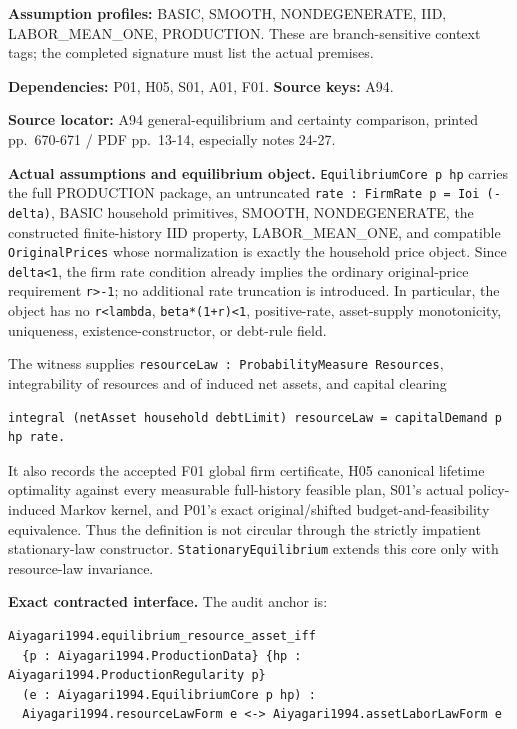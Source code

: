 \documentclass[
  11pt,
]{article}
\let\LedgerOriginalTexttt\texttt
\renewcommand{\texttt}[1]{{\small\LedgerOriginalTexttt{#1}}}
\begin{document}
\textbf{Assumption profiles:} BASIC, SMOOTH, NONDEGENERATE, IID,
LABOR\_MEAN\_ONE, PRODUCTION. These are branch-sensitive context tags;
the completed signature must list the actual premises.

\textbf{Dependencies:} P01, H05, S01, A01, F01. \textbf{Source keys:}
A94.

\textbf{Source locator:} A94 general-equilibrium and certainty
comparison, printed pp.~670-671 / PDF pp.~13-14, especially notes 24-27.

\textbf{Actual assumptions and equilibrium object.}
\texttt{EquilibriumCore\ p\ hp} carries the full PRODUCTION package, an
untruncated \texttt{rate\ :\ FirmRate\ p\ =\ Ioi\ (-delta)}, BASIC
household primitives, SMOOTH, NONDEGENERATE, the constructed
finite-history IID property, LABOR\_MEAN\_ONE, and compatible
\texttt{OriginalPrices} whose normalization is exactly the household
price object. Since \texttt{delta\textless{}1}, the firm rate condition
already implies the ordinary original-price requirement
\texttt{r\textgreater{}-1}; no additional rate truncation is introduced.
In particular, the object has no \texttt{r\textless{}lambda},
\texttt{beta*(1+r)\textless{}1}, positive-rate, asset-supply
monotonicity, uniqueness, existence-constructor, or debt-rule field.

The witness supplies
\texttt{resourceLaw\ :\ ProbabilityMeasure\ Resources}, integrability of
resources and of induced net assets, and capital clearing

\begin{verbatim}
integral (netAsset household debtLimit) resourceLaw = capitalDemand p hp rate.
\end{verbatim}

It also records the accepted F01 global firm certificate, H05 canonical
lifetime optimality against every measurable full-history feasible plan,
S01's actual policy-induced Markov kernel, and P01's exact
original/shifted budget-and-feasibility equivalence. Thus the definition
is not circular through the strictly impatient stationary-law
constructor. \texttt{StationaryEquilibrium} extends this core only with
resource-law invariance.

\textbf{Exact contracted interface.} The audit anchor is:

\begin{verbatim}
Aiyagari1994.equilibrium_resource_asset_iff
  {p : Aiyagari1994.ProductionData} {hp : Aiyagari1994.ProductionRegularity p}
  (e : Aiyagari1994.EquilibriumCore p hp) :
  Aiyagari1994.resourceLawForm e <-> Aiyagari1994.assetLaborLawForm e
\end{verbatim}
\end{document}
